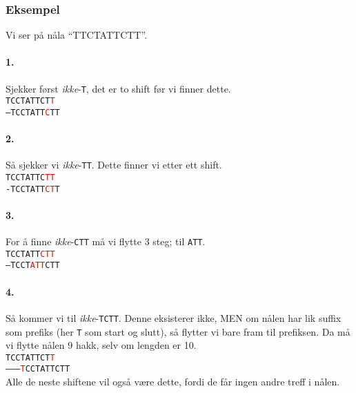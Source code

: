 		\subsubsection*{Eksempel}
		Vi ser på nåla ``TTCTATTCTT''.

\begin{minipage}{0.5\textwidth}
\paragraph{1.} Sjekker først \textit{ikke}-\texttt{T}, det er to shift før vi finner dette.
\\
\noindent\texttt{TCCTATTCT\textcolor{red}{T}}\\
\texttt{--TCCTATT\textcolor{red}{C}TT}
\\
\paragraph{2.} Så sjekker vi \textit{ikke}-\texttt{TT}. Dette finner vi etter ett shift.
\\
\noindent\texttt{TCCTATTC\textcolor{red}{TT}}\\
\texttt{-TCCTATT\textcolor{red}{CT}T}
\\
\paragraph{3.} For å finne \textit{ikke}-\texttt{CTT} må vi flytte 3 steg; til \texttt{ATT}.
\\
\noindent\texttt{TCCTATT\textcolor{red}{CTT}}\\
\texttt{---TCCT\textcolor{red}{ATT}CTT}
\end{minipage}
\hspace{10pt}
\begin{minipage}{0.5\textwidth}
\paragraph{4.} Så kommer vi til \textit{ikke}-\texttt{TCTT}. Denne eksisterer ikke, MEN om nålen har lik suffix som prefiks (her \texttt{T} som start og slutt), så flytter vi bare fram til prefiksen. Da må vi flytte nålen 9 hakk, selv om lengden er 10.
\\
\noindent\texttt{TCCTATTCT\textcolor{red}{T}}\\
\texttt{---------\textcolor{red}{T}CCTATTCTT}
\\
Alle de neste shiftene vil også være dette, fordi de får ingen andre treff i nålen.
\end{minipage}

